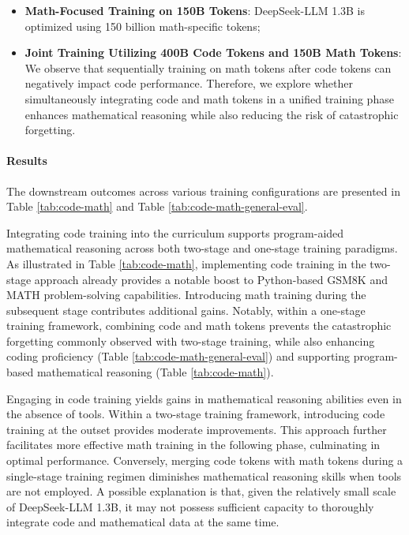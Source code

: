 \begin{itemize}[topsep=0pt]
\begin{itemize}[topsep=0pt]
\begin{itemize}[topsep=0pt]
    \item \textbf{Math-Focused Training on 150B Tokens}: DeepSeek-LLM 1.3B is optimized using 150 billion math-specific tokens;
    \item \textbf{Joint Training Utilizing 400B Code Tokens and 150B Math Tokens}: We observe that sequentially training on math tokens after code tokens can negatively impact code performance. Therefore, we explore whether simultaneously integrating code and math tokens in a unified training phase enhances mathematical reasoning while also reducing the risk of catastrophic forgetting.
\end{itemize}

\paragraph{Results}
The downstream outcomes across various training configurations are presented in Table \ref{tab:code-math} and Table \ref{tab:code-math-general-eval}.

Integrating code training into the curriculum supports program-aided mathematical reasoning across both two-stage and one-stage training paradigms. As illustrated in Table \ref{tab:code-math}, implementing code training in the two-stage approach already provides a notable boost to Python-based GSM8K and MATH problem-solving capabilities. Introducing math training during the subsequent stage contributes additional gains. Notably, within a one-stage training framework, combining code and math tokens prevents the catastrophic forgetting commonly observed with two-stage training, while also enhancing coding proficiency (Table \ref{tab:code-math-general-eval}) and supporting program-based mathematical reasoning (Table \ref{tab:code-math}).

Engaging in code training yields gains in mathematical reasoning abilities even in the absence of tools. Within a two-stage training framework, introducing code training at the outset provides moderate improvements. This approach further facilitates more effective math training in the following phase, culminating in optimal performance. Conversely, merging code tokens with math tokens during a single-stage training regimen diminishes mathematical reasoning skills when tools are not employed. A possible explanation is that, given the relatively small scale of DeepSeek-LLM 1.3B, it may not possess sufficient capacity to thoroughly integrate code and mathematical data at the same time.


\end{itemize}
\end{itemize}
